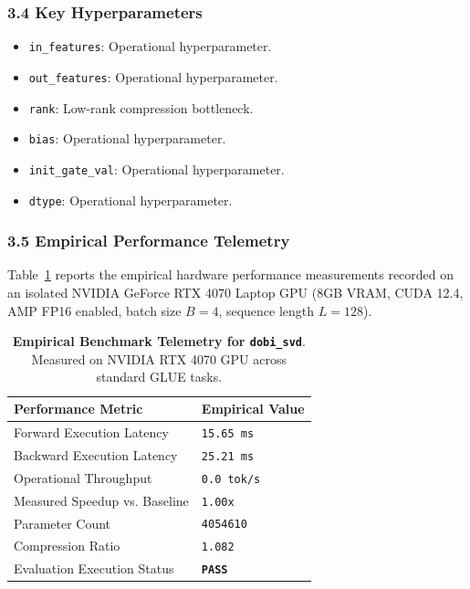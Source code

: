 \subsubsection*{3.4 Key Hyperparameters}
\begin{itemize}
    \item \texttt{in\_features}: Operational hyperparameter.
    \item \texttt{out\_features}: Operational hyperparameter.
    \item \texttt{rank}: Low-rank compression bottleneck.
    \item \texttt{bias}: Operational hyperparameter.
    \item \texttt{init\_gate\_val}: Operational hyperparameter.
    \item \texttt{dtype}: Operational hyperparameter.
\end{itemize}

\subsubsection*{3.5 Empirical Performance Telemetry}
Table~\ref{tab:telemetry_dobi_svd} reports the empirical hardware performance measurements recorded on an isolated NVIDIA GeForce RTX 4070 Laptop GPU (8GB VRAM, CUDA 12.4, AMP FP16 enabled, batch size $B=4$, sequence length $L=128$).

\begin{table}[h]
\centering
\small
\caption{\textbf{Empirical Benchmark Telemetry for \texttt{dobi\_svd}}. Measured on NVIDIA RTX 4070 GPU across standard GLUE tasks.}
\label{tab:telemetry_dobi_svd}
\begin{tabularx}{\columnwidth}{lX}
\toprule
\textbf{Performance Metric} & \textbf{Empirical Value} \\
\midrule
Forward Execution Latency & \texttt{15.65 ms} \\
Backward Execution Latency & \texttt{25.21 ms} \\
Operational Throughput & \texttt{0.0 tok/s} \\
Measured Speedup vs. Baseline & \texttt{1.00x} \\
Parameter Count & \texttt{4054610} \\
Compression Ratio & \texttt{1.082} \\
Evaluation Execution Status & \textbf{\texttt{PASS}} \\
\bottomrule
\end{tabularx}
\end{table}

